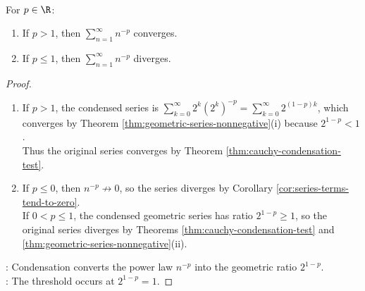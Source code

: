 \begin{corollary} \label{cor:p-series-test} \\
For $p\in\R$:
\begin{enumerate}[label=(\roman*)]
\setlength{\itemsep}{0pt}
\item If $p>1$, then $\sum\limits_{n=1}^{\infty}n^{-p}$ converges.
\item If $p\leq1$, then $\sum\limits_{n=1}^{\infty}n^{-p}$ diverges.
\end{enumerate}
\begin{proof}
\begin{enumerate}[label=(\roman*)]
\setlength{\itemsep}{0pt}
\item If $p>1$, the condensed series is $\sum\limits_{k=0}^{\infty}2^k(2^k)^{-p}=\sum\limits_{k=0}^{\infty}2^{(1-p)k}$, which converges by Theorem \ref{thm:geometric-series-nonnegative}(i) because $2^{1-p}<1$.\\
Thus the original series converges by Theorem \ref{thm:cauchy-condensation-test}.
\item If $p\leq0$, then $n^{-p}\not\to0$, so the series diverges by Corollary \ref{cor:series-terms-tend-to-zero}.\\
If $0<p\leq1$, the condensed geometric series has ratio $2^{1-p}\geq1$, so the original series diverges by Theorems \ref{thm:cauchy-condensation-test} and \ref{thm:geometric-series-nonnegative}(ii).
\end{enumerate}
: Condensation converts the power law $n^{-p}$ into the geometric ratio $2^{1-p}$.\\
: The threshold occurs at $2^{1-p}=1$.
\end{proof}
\end{corollary}

